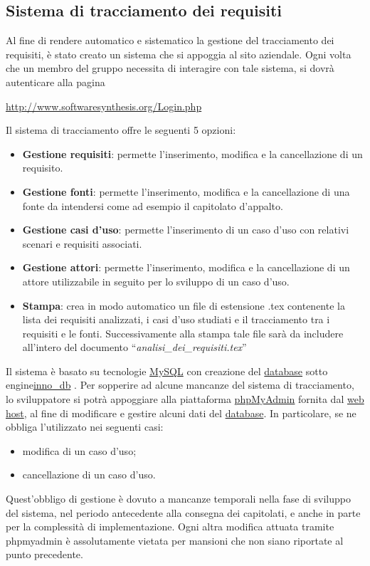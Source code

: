 \subsection{Sistema di tracciamento dei requisiti}
\label{sec:tracciamento}
Al fine di rendere automatico e sistematico la gestione del tracciamento dei requisiti, è stato creato un sistema che si appoggia al sito aziendale. Ogni volta che un membro del gruppo necessita di interagire con tale sistema, si dovrà autenticare alla pagina
\newline
\begin{center}
\url{http://www.softwaresynthesis.org/Login.php}
\end{center}
Il sistema di tracciamento offre le seguenti 5 opzioni:
\begin{itemize}
\item \textbf{Gestione requisiti}: permette l'inserimento, modifica e la cancellazione di un requisito.
\item \textbf{Gestione fonti}: permette l'inserimento, modifica e la cancellazione di una fonte da intendersi come ad esempio il capitolato d'appalto.
\item \textbf{Gestione casi d'uso}: permette l'inserimento di un caso d'uso con relativi scenari  e requisiti associati.
\item \textbf{Gestione attori}: permette l'inserimento, modifica e la cancellazione di un attore utilizzabile in seguito per lo sviluppo di un caso d'uso.
\item \textbf{Stampa}: crea in modo automatico un file di estensione .tex contenente la lista dei requisiti analizzati, i casi d'uso studiati e il tracciamento tra i requisiti e le fonti. Successivamente alla stampa tale file sarà da includere all'intero del documento ``\textit{analisi\_dei\_requisiti.tex}''
\end{itemize}
Il sistema è basato su tecnologie \underline{MySQL} con creazione del \underline{database} sotto engine\underline{inno\_db} . Per sopperire ad alcune mancanze del sistema di tracciamento, lo sviluppatore si potrà appoggiare alla piattaforma \underline{phpMyAdmin} fornita dal \underline{web host}, al fine di modificare e gestire alcuni dati del \underline{database}. In particolare, se ne obbliga l'utilizzato nei seguenti casi:
\begin{itemize}
\item modifica di un caso d'uso;
\item cancellazione di un caso d'uso.
\end{itemize}
Quest'obbligo di gestione è dovuto a mancanze temporali nella fase di sviluppo del sistema, nel periodo antecedente alla consegna dei capitolati, e anche in parte per la complessità di implementazione.
\newline
Ogni altra modifica attuata tramite phpmyadmin è assolutamente vietata per mansioni che non siano riportate al punto precedente.


